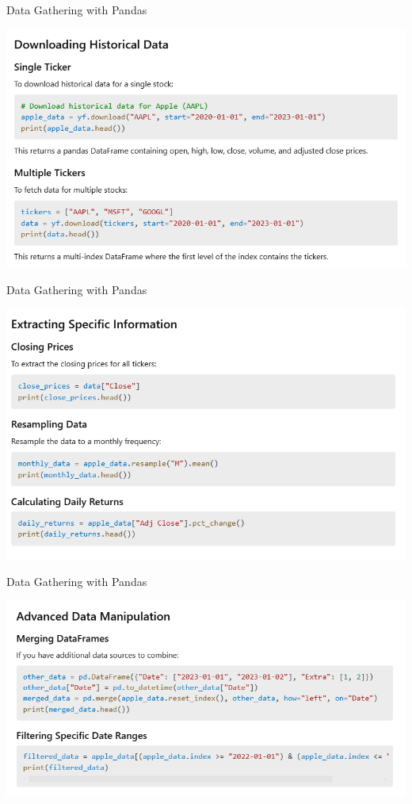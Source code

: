 \documentclass[11pt]{beamer}
\begin{document}
\begin{frame}{Data Gathering with Pandas}
	\begin{center}
	\includegraphics[scale=0.55]{../05-pictures/lesson-1-3_pic_13.png}
	\end{center}
\end{frame}
\begin{frame}{Data Gathering with Pandas}
	\begin{center}
	\includegraphics[scale=0.55]{../05-pictures/lesson-1-3_pic_14.png}
	\end{center}
\end{frame}
\begin{frame}{Data Gathering with Pandas}
	\begin{center}
	\includegraphics[scale=0.55]{../05-pictures/lesson-1-3_pic_15.png}
	\end{center}
\end{frame}
\end{document}

